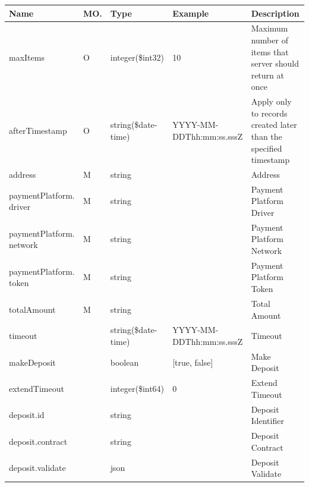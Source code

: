\begin{enumerate}
\begin{enumerate}
\begin{table}[H]
\footnotesize

\begin{center}
\begin{tabular}{|p{3cm}|l|p{3cm}|p{3cm}|p{4cm}|} 
\hline
\rowcolor{lightgray}	Name	& MO.	& Type	& Example & 	Description \\
\hline

maxItems			& O	& 	integer(\$int32)	&	10							&	Maximum number of items that server should return at once \\ 
\hline

afterTimestamp		& O &	string(\$date-time)	&	YYYY-MM-DDThh:mm:ss.sssZ	&	Apply only to records created later than the specified timestamp \\
\hline

address						& M	&	string				&								&	Address	 \\
\hline   
  
paymentPlatform. driver		& M	&	string				&								&	Payment Platform Driver \\
\hline   

paymentPlatform. network	& M	&	string				&								&	Payment Platform Network \\
\hline   
  
paymentPlatform. token		& M	&	string				&								&	Payment Platform Token \\
\hline
     
totalAmount					& M	&	string				&								&	Total Amount \\
\hline

timeout						& 	& 	string(\$date-time)	&	YYYY-MM-DDThh:mm:ss.sssZ	&	Timeout \\ 
\hline

makeDeposit					& 	& 	boolean				&	[true, false]				&	Make Deposit \\ 
\hline

extendTimeout				& 	& 	integer(\$int64)	&	0							&	Extend Timeout \\ 
\hline

deposit.id					&   & 	string				&								&	Deposit Identifier \\
\hline

deposit.contract			&   &	string				&								&	Deposit Contract \\
\hline

deposit.validate			&   &	json				&								&	Deposit Validate \\
\hline

\end{tabular}
\end{center}
\end{table}


\end{enumerate}
\end{enumerate}
